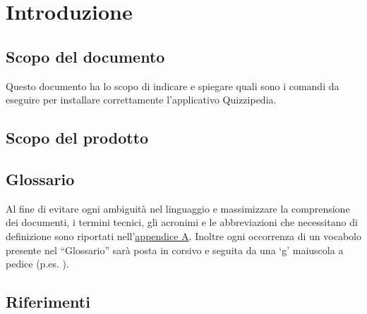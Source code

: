 \documentclass[a4paper, titlepage]{article}
\begin{document}
	
	\pagestyle{fancy}	
	
	\maketitle
	
	
	
	\newpage
	\tableofcontents\label{lastromanpage}
	
	\newpage
	\clearpage	
	\hypersetup{linkcolor=blue}
	
	\section{Introduzione}
	\subsection{Scopo del documento}
	Questo documento ha lo scopo di indicare e spiegare quali sono i comandi da eseguire per installare correttamente l'applicativo Quizzipedia.
	
	\subsection{Scopo del prodotto}
	\SCOPO
	
	\subsection{Glossario}
	Al fine di evitare ogni ambiguità nel linguaggio e massimizzare la comprensione dei documenti, i termini tecnici, gli acronimi e le abbreviazioni che necessitano di definizione sono riportati nell'\hyperref[gl]{appendice A}.
	Inoltre ogni occorrenza di un vocabolo presente nel “Glossario” sarà posta in corsivo e seguita da
	una ‘g’ maiuscola a pedice (p.es. ).
		
	\subsection{Riferimenti}	
\end{document}
